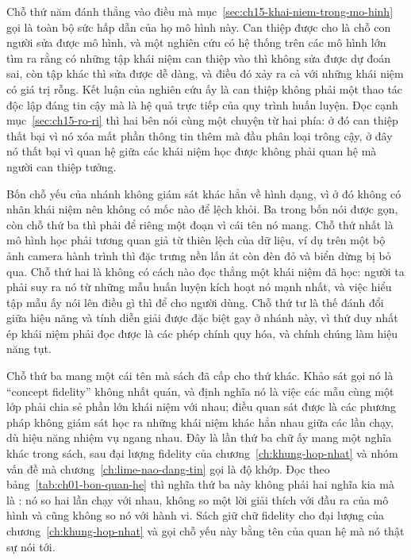 %
Chỗ thứ năm đánh thẳng vào điều mà mục~\ref{sec:ch15-khai-niem-trong-mo-hinh} gọi
là toàn bộ sức hấp dẫn của họ mô hình này. Can thiệp được cho là chỗ con người
sửa được mô hình, và một nghiên cứu có hệ thống trên các mô hình lớn tìm ra rằng
có những tập khái niệm can thiệp vào thì không sửa được dự đoán sai, còn tập
khác thì sửa được dễ dàng, và điều đó xảy ra cả với những khái niệm có giá trị
rỗng. Kết luận của nghiên cứu ấy là can thiệp không phải một thao tác độc lập
đáng tin cậy mà là hệ quả trực tiếp của quy trình huấn luyện. Đọc cạnh
mục~\ref{sec:ch15-ro-ri} thì hai bên nói cùng một chuyện từ hai phía: ở đó can
thiệp thất bại vì nó xóa mất phần thông tin thêm mà đầu phân loại trông cậy, ở
đây nó thất bại vì quan hệ giữa các khái niệm học được không phải quan hệ mà
người can thiệp tưởng.

%
Bốn chỗ yếu của nhánh không giám sát khác hẳn về hình dạng, vì ở đó không có
nhãn khái niệm nên không có mốc nào để lệch khỏi. Ba trong bốn nói được gọn, còn
chỗ thứ ba thì phải để riêng một đoạn vì cái tên nó mang. Chỗ thứ nhất là mô
hình học phải tương quan giả từ thiên lệch của dữ liệu, ví dụ trên một bộ ảnh
camera hành trình thì đặc trưng nền lấn át còn đèn đỏ và biển dừng bị bỏ qua.
Chỗ thứ hai là không có cách nào đọc thẳng một khái niệm đã học: người ta phải
suy ra nó từ những mẫu huấn luyện kích hoạt nó mạnh nhất, và việc hiểu tập mẫu
ấy nói lên điều gì thì để cho người dùng. Chỗ thứ tư là thế đánh đổi giữa hiệu
năng và tính diễn giải được đặc biệt gay ở nhánh này, vì thứ duy nhất ép khái
niệm phải đọc được là các phép chính quy hóa, và chính chúng làm hiệu năng tụt.

%
Chỗ thứ ba mang một cái tên mà sách đã cấp cho thứ khác. Khảo sát gọi nó là
\enquote{concept fidelity} không nhất quán, và định nghĩa nó là việc các mẫu
cùng một lớp phải chia sẻ phần lớn khái niệm với nhau; điều quan sát được là các
phương pháp không giám sát học ra những khái niệm khác hẳn nhau giữa các lần
chạy, dù hiệu năng nhiệm vụ ngang nhau. Đây là lần thứ ba chữ ấy mang một nghĩa
khác trong sách, sau đại lượng fidelity của chương~\ref{ch:khung-hop-nhat} và
nhóm vấn đề mà chương~\ref{ch:lime-nao-dang-tin} gọi là độ khớp. Đọc theo
bảng~\ref{tab:ch01-bon-quan-he} thì nghĩa thứ ba này không phải hai nghĩa kia mà
là : nó so hai lần chạy với nhau, không so một lời
giải thích với
đầu ra của mô hình và cũng không so nó với hành vi. Sách giữ chữ fidelity cho
đại lượng của chương~\ref{ch:khung-hop-nhat} và gọi chỗ yếu này bằng tên của
quan hệ mà nó thật sự nói tới.

